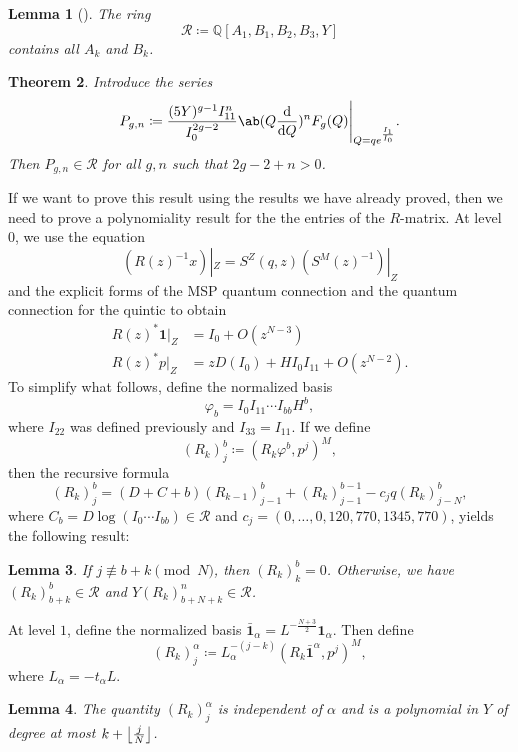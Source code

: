 \documentclass[10pt]{amsart}
\DeclarePairedDelimiter{\floor}{\lfloor}{\rfloor}
\newtheorem{thm}{Theorem}[section]
\newtheorem{lem}[thm]{Lemma}
\theoremstyle{definition}
\theoremstyle{remark}
\theoremstyle{plain}
\theoremstyle{definition}
\theoremstyle{remark}
\newcommand{\Q}{\mathbb{Q}}
\newcommand{\mc}[1]{\mathcal{#1}}
\newcommand{\1}{\mathbf{1}}
\newcommand{\2}{\mathbf{2}}
\newcommand{\3}{\mathbf{3}}
\begin{document}
\begin{lem}[\cite{yy04}]
    The ring
    \[ \mc{R} \coloneqq \Q[A_1, B_1, B_2, B_3, Y] \]
    contains all $A_k$ and $B_k$.
\end{lem}

\begin{thm}\label{thm:finitegenerationmsp}
    Introduce the series
    \[ P_{g,n} \coloneqq \frac{(5Y)^{g-1} I_{11}^n}{I_0^{2g-2}} \ab(Q \odv{}{Q})^n F_g(Q) \Bigg|_{Q = qe^{\frac{I_1}{I_0}}}. \]
    Then $P_{g,n} \in \mc{R}$ for all $g,n$ such that $2g-2+n > 0$.
\end{thm}

If we want to prove this result using the results we have already proved, then we need to prove a polynomiality result for the the entries of the $R$-matrix. At level $0$, we use the equation
\[ (R(z)^{-1}x)|_Z = S^Z(q,z) (S^M(z)^{-1})|_Z \]
and the explicit forms of the MSP quantum connection and the quantum connection for the quintic to obtain
\begin{align*}
    R(z)^* \1 |_Z &= I_0 + O(z^{N-3}) \\
    R(z)^* p |_Z &= z D(I_0) + H I_0 I_{11} + O(z^{N-2}).
\end{align*}
To simplify what follows, define the normalized basis
\[ \varphi_b = I_0 I_{11} \cdots I_{bb} H^b, \]
where $I_{22}$ was defined previously and $I_{33} = I_{11}$. If we define
\[ (R_k)_j^b \coloneqq (R_k \varphi^b, p^j)^M, \]
then the recursive formula
\[ (R_k)_j^b = (D+C+b)(R_{k-1})_{j-1}^b + (R_k)_{j-1}^{b-1} - c_j q (R_k)_{j-N}^b, \]
where $C_b = D \log (I_0 \cdots I_{bb}) \in \mc{R}$ and $c_j = (0,\ldots,0,120,770,1345,770)$, yields the following result:
\begin{lem}
    If $j \not\equiv b+k \pmod{N}$, then $(R_k)_k^b = 0$. Otherwise, we have $(R_k)_{b+k}^b \in \mc{R}$ and $Y (R_k)_{b+N+k}^n \in \mc{R}$.
\end{lem}

At level $1$, define the normalized basis $\bar{\1}_{\alpha} = L^{-\frac{N+3}{2}}\1_{\alpha}$. Then define
\[ (R_k)_j^{\alpha} \coloneqq L_{\alpha}^{-(j-k)} (R_k \bar{\1}^{\alpha}, p^j)^M, \]
where $L_{\alpha} = -t_{\alpha} L$.
\begin{lem}
    The quantity $(R_k)_j^{\alpha}$ is independent of $\alpha$ and is a polynomial in $Y$ of degree at most $k + \floor*{\frac{j}{N}}$.
\end{lem}
\end{document}
